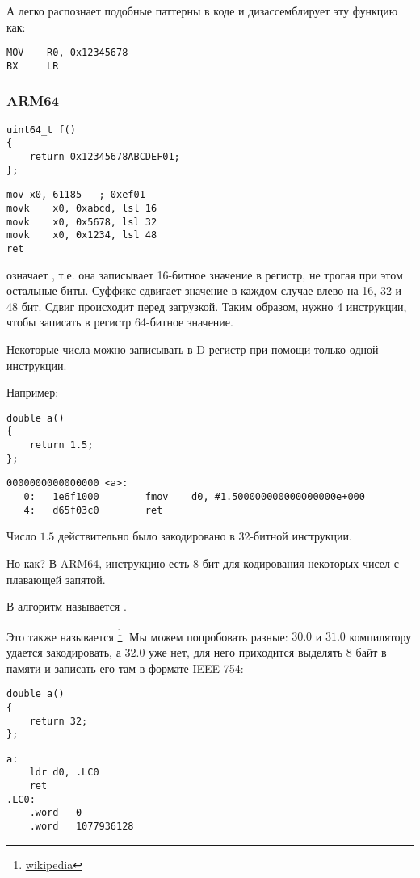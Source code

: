 А \IDA легко распознает подобные паттерны в коде и дизассемблирует эту функцию как:

\begin{lstlisting}
MOV    R0, 0x12345678
BX     LR
\end{lstlisting}

\subsubsection{ARM64}

\begin{lstlisting}
uint64_t f()
{
	return 0x12345678ABCDEF01;
};
\end{lstlisting}

\begin{lstlisting}[caption=GCC 4.9.1 -O3]
mov	x0, 61185   ; 0xef01
movk	x0, 0xabcd, lsl 16
movk	x0, 0x5678, lsl 32
movk	x0, 0x1234, lsl 48
ret
\end{lstlisting}

 означает , т.е. она записывает 16-битное значение в регистр, не трогая
при этом остальные биты.
Суффикс  сдвигает значение в каждом случае влево на 16, 32 и 48 бит. Сдвиг происходит
перед загрузкой.
Таким образом, нужно 4 инструкции, чтобы записать в регистр 64-битное значение.


Некоторые числа можно записывать в D-регистр при помощи только одной инструкции.

Например:

\begin{lstlisting}
double a()
{
	return 1.5;
};
\end{lstlisting}

\begin{lstlisting}[caption=GCC 4.9.1 -O3 + objdump]
0000000000000000 <a>:
   0:   1e6f1000        fmov    d0, #1.500000000000000000e+000
   4:   d65f03c0        ret
\end{lstlisting}

Число $1.5$ действительно было закодировано в 32-битной инструкции.

Но как?
В ARM64, инструкцию  есть 8 бит для кодирования некоторых чисел с плавающей запятой.

В \ARMSixFourRefURL алгоритм называется .

Это также называется \footnote{\href{http://go.yurichev.com/17139}{wikipedia}}.
Мы можем попробовать разные: $30.0$ и $31.0$ компилятору удается закодировать, а $32.0$ уже нет, для него
приходится выделять 8 байт в памяти и записать его там в формате IEEE 754:

\begin{lstlisting}
double a()
{
	return 32;
};
\end{lstlisting}

\begin{lstlisting}[caption=GCC 4.9.1 -O3]
a:
	ldr	d0, .LC0
	ret
.LC0:
	.word	0
	.word	1077936128
\end{lstlisting}
